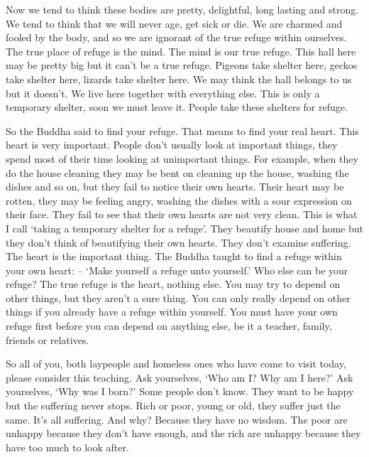 Now we tend to think these bodies are pretty, delightful, long lasting and strong. We tend to think that we will never age, get sick or die. We are charmed and fooled by the body, and so we are ignorant of the true refuge within ourselves. The true place of refuge is the mind. The mind is our true refuge. This hall here may be pretty big but it can't be a true refuge. Pigeons take shelter here, geckos take shelter here, lizards take shelter here. We may think the hall belongs to us but it doesn't. We live here together with everything else. This is only a temporary shelter, soon we must leave it. People take these shelters for refuge.

So the Buddha said to find your refuge. That means to find your real heart. This heart is very important. People don't usually look at important things, they spend most of their time looking at unimportant things. For example, when they do the house cleaning they may be bent on cleaning up the house, washing the dishes and so on, but they fail to notice their own hearts. Their heart may be rotten, they may be feeling angry, washing the dishes with a sour expression on their face. They fail to see that their own hearts are not very clean. This is what I call `taking a temporary shelter for a refuge'. They beautify house and home but they don't think of beautifying their own hearts. They don't examine suffering. The heart is the important thing. The Buddha taught to find a refuge within your own heart:  -- `Make yourself a refuge unto yourself.' Who else can be your refuge? The true refuge is the heart, nothing else. You may try to depend on other things, but they aren't a sure thing. You can only really depend on other things if you already have a refuge within yourself. You must have your own refuge first before you can depend on anything else, be it a teacher, family, friends or relatives.

So all of you, both laypeople and homeless ones who have come to visit today, please consider this teaching. Ask yourselves, `Who am I? Why am I here?' Ask yourselves, `Why was I born?' Some people don't know. They want to be happy but the suffering never stops. Rich or poor, young or old, they suffer just the same. It's all suffering. And why? Because they have no wisdom. The poor are unhappy because they don't have enough, and the rich are unhappy because they have too much to look after.

